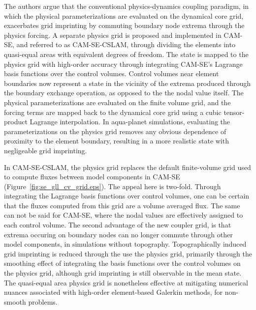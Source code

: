 \documentclass[twocol]{ametsoc}
\begin{document}
The authors argue that the conventional physics-dynamics coupling paradigm, in which the physical parameterizations are evaluated on the dynamical core grid, exacerbates grid imprinting by commuting boundary node extrema through the physics forcing. A separate physics grid is proposed and implemented in CAM-SE, and referred to as CAM-SE-CSLAM, through dividing the elements into quasi-equal areas with equivalent degrees of freedom. The state is mapped to the physics grid with high-order accuracy through integrating CAM-SE's Lagrange basis functions over the control volumes. Control volumes near element boundaries now represent a state in the vicinity of the extrema produced through the boundary exchange operation, as opposed to the the nodal value itself. The physical parameterizations are evaluated on the finite volume grid, and the forcing terms are mapped back to the dynamical core grid using a cubic tensor-product Lagrange interpolation. {\color{red}{The mapping procedures do not conserve total energy, nor axial angular momentum, but energy and AAM diagnostics indicate that these errors are unimportant.}} In aqua-planet simulations, evaluating the parameterizations on the physics grid removes any obvious dependence of proximity to the element boundary, resulting in a more realistic state with negligeable grid imprinting.


In CAM-SE-CSLAM, the physics grid replaces the default finite-volume grid used to compute fluxes between model components in CAM-SE (Figure~\ref{fig:se_gll_cv_grid.eps}). The appeal here is two-fold. Through integrating the Lagrange basis functions over control volumes, one can be certain that the fluxes computed from this grid are a volume averaged flux. The same can not be said for CAM-SE, where the nodal values are effectively assigned to each control volume. The second advantage of the new coupler grid, is that extrema occuring on boundary nodes can no longer commute through other model components, in simulations without topography. Topographically induced grid imprinting is reduced through the use the physics grid, primarily through the smoothing effect of integrating the basis functions over the control volumes on the physics grid, although grid imprinting is still observable in the mean state. The quasi-equal area physics grid is nonetheless effective at mitigating numerical nuances associated with high-order element-based Galerkin methods, for non-smooth problems.  
\end{document}
